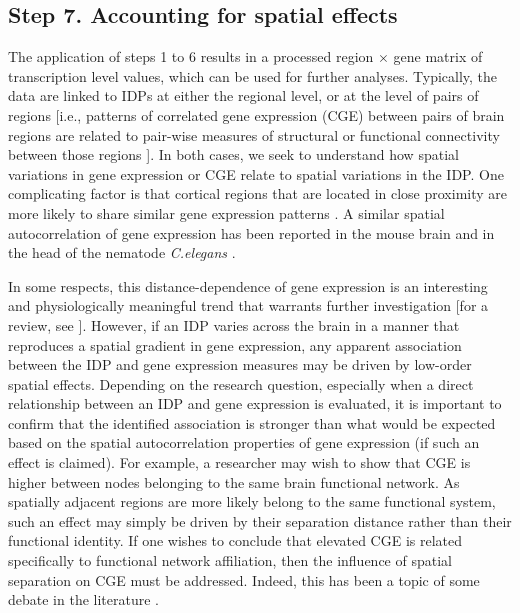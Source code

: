 \subsection{Step 7. Accounting for spatial effects}

The application of steps 1 to 6 results in a processed region $\times$ gene matrix of transcription level values, which can be used for further analyses. Typically, the data are linked to IDPs at either the regional level, or at the level of pairs of regions [i.e., patterns of correlated gene expression (CGE) between pairs of brain regions are related to pair-wise measures of structural or functional connectivity between those regions \citep{Fornito2019}]. In both cases, we seek to understand how spatial variations in gene expression or CGE relate to spatial variations in the IDP. One complicating factor is that cortical regions that are located in close proximity are more likely to share similar gene expression patterns \citep{Richiardi2015,Krienen2016,Vertes2016b,Pantazatos2017,Richiardi2017}. A similar spatial autocorrelation of gene expression has been reported in the mouse brain \citep{Fulcher2016} and in the head of the nematode \textit{C.elegans} \citep{Arnatkeviciute2018}.

In some respects, this distance-dependence of gene expression is an interesting and physiologically meaningful trend that warrants further investigation [for a review, see \citep{Fornito2019}]. However, if an IDP varies across the brain in a manner that reproduces a spatial gradient in gene expression, any apparent association between the IDP and gene expression measures may be driven by low-order spatial effects. Depending on the research question, especially when a direct relationship between an IDP and gene expression is evaluated, it is important to confirm that the identified association is stronger than what would be expected based on the spatial autocorrelation properties of gene expression (if such an effect is claimed). For example, a researcher may wish to show that CGE is higher between nodes belonging to the same brain functional network. As spatially adjacent regions are more likely belong to the same functional system, such an effect may simply be driven by their separation distance rather than their functional identity. If one wishes to conclude that elevated CGE is related specifically to functional network affiliation, then the influence of spatial separation on CGE must be addressed. Indeed, this has been a topic of some debate in the literature \citep{Richiardi2015,Pantazatos2017,Richiardi2017}.

